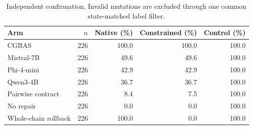 \begin{table}[t]
\centering
\small
\caption{Independent confirmation. Invalid mutations are excluded through one common state-matched label filter.}
\begin{tabular}{lrrrr}
\toprule
Arm & $n$ & Native (\%) & Constrained (\%) & Control (\%) \\
\midrule
CGBAS & 226 & 100.0 & 100.0 & 100.0 \\
Mistral-7B & 226 & 49.6 & 49.6 & 100.0 \\
Phi-4-mini & 226 & 42.9 & 42.9 & 100.0 \\
Qwen3-4B & 226 & 36.7 & 36.7 & 100.0 \\
Pairwise contract & 226 & 8.4 & 7.5 & 100.0 \\
No repair & 226 & 0.0 & 0.0 & 100.0 \\
Whole-chain rollback & 226 & 100.0 & 0.0 & 100.0 \\
\bottomrule
\end{tabular}
\end{table}
